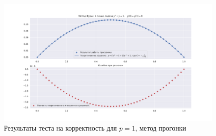 \documentclass[14pt,a4paper]{extarticle}
\newcommand{\1}{\mathbbm{1}}
\begin{document}
\begin{figure}
    \centering
    \includegraphics[scale=0.4]{figs/s50p1f1.pdf}
    \caption{Результаты теста на корректность для $p=1$, метод прогонки}
\end{figure}
\end{document}
